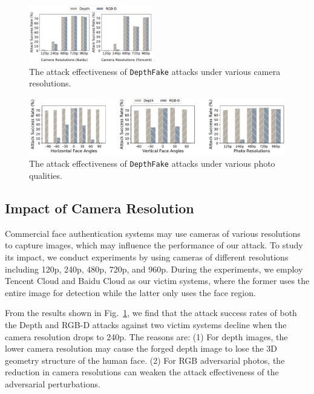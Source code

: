 \begin{figure}[pt]
	\centerline{\includegraphics[width = 0.48\textwidth]{figures/camera_resolution.pdf}}
	\vspace{-0.15in}
	\caption{The attack effectiveness of \texttt{DepthFake} attacks under various camera resolutions.}
	\label{camera_resolution}
	\vspace{-0.15in}
\end{figure}


\begin{figure}[pt]
	\centerline{\includegraphics[width = \textwidth]{figures/photo_quality.pdf}}
	\vspace{-0.15in}
	\caption{The attack effectiveness of \texttt{DepthFake} attacks under various photo qualities. }
	\label{photo_quality}
	\vspace{-0.15in}
\end{figure}

\subsection{Impact of Camera Resolution} 
Commercial face authentication systems may use cameras of various resolutions to capture images, which may influence the performance of our attack. To study its impact, we conduct experiments by using cameras of different resolutions including 120p, 240p, 480p, 720p, and 960p. During the experiments, we employ Tencent Cloud and Baidu Cloud as our victim systems, where the former uses the entire image for detection while the latter only uses the face region. 

From the results shown in Fig.~\ref{camera_resolution},  we find that the attack success rates of both the Depth and RGB-D attacks against two victim systems decline  when the camera resolution drops to 240p. The reasons are: 
(1) For depth images, the lower camera resolution may cause the forged depth image to lose the 3D geometry structure of the human face.
(2) For RGB adversarial photos, the reduction in camera resolutions can weaken the attack effectiveness of the adversarial perturbations. 

